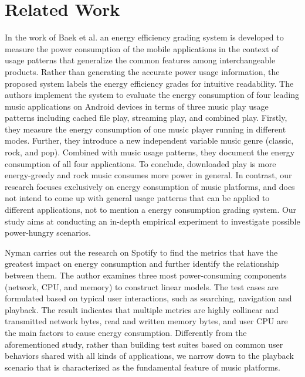\section{Related Work}\label{sec:related}
In the work of Baek et al. \cite{baek2018energy} an energy efficiency grading system is developed to measure the power consumption of the mobile applications in the context of usage patterns that generalize the common features among interchangeable products. Rather than generating the accurate power usage information, the proposed system labels the energy efficiency grades for intuitive readability. The authors implement the system to evaluate the energy consumption of four leading music applications on Android devices in terms of three music play usage patterns including cached file play, streaming play, and combined play. Firstly, they measure the energy consumption of one music player running in different modes. Further, they introduce a new independent variable music genre (\ie classic, rock, and pop). Combined with music usage patterns, they document the energy consumption of all four applications. To conclude, downloaded play is more energy-greedy and rock music consumes more power in general. In contrast, our research focuses exclusively on energy consumption of music platforms, and does not intend to come up with general usage patterns that can be applied to different applications, not to mention a energy consumption grading system. Our study aims at conducting an in-depth empirical experiment to investigate possible power-hungry scenarios. 

Nyman \cite{nyman2020estimating} carries out the research on Spotify to find the metrics that have the greatest impact on energy consumption and further identify the relationship between them. The author examines three most power-consuming components (\ie network, CPU, and memory) to construct linear models. The test cases are formulated based on typical user interactions, such as searching, navigation and playback. The result indicates that multiple metrics are highly collinear and transmitted network bytes, read and written memory bytes, and user CPU are the main factors to cause energy consumption. Differently from the aforementioned study, rather than building test suites based on common user behaviors shared with all kinds of applications, we narrow down to the playback scenario that is characterized as the fundamental feature of music platforms. 

